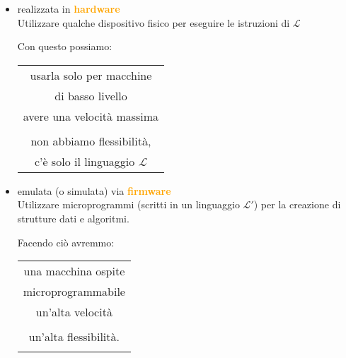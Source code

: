 \documentclass[a4paper,11pt,hidelinks]{book}
\theoremstyle{definition}
\begin{document}
    \begin{multicols}{2}
    
    \begin{itemize}
        \item realizzata in \textcolor{orange}{\textbf{hardware}} \label{realizzare HW} \\
        Utilizzare qualche dispositivo fisico per eseguire le istruzioni di $\mathcal{L}$ 
        
        \vspace{0.41cm}

        Con questo possiamo:

        \begin{tabular}{|c|}
        \hline
            usarla solo per macchine \\ di basso livello   \\ \hline
            avere una velocità massima \\ \\ \hline
            non abbiamo flessibilità, \\ c'è solo il linguaggio $\mathcal{L}$ \\ \hline
        \end{tabular}
        
        
        
        \item emulata (o simulata) via \textcolor{orange}{\textbf{firmware}} \label{emulare via FW} \\
        Utilizzare microprogrammi (scritti in un linguaggio $\mathcal{L}'$) per la creazione di strutture dati e algoritmi. 
        

        Facendo ciò avremmo:
        
        \begin{tabular}{|c|}
        \hline
            una macchina ospite \\ microprogrammabile \\ \hline
            un'alta velocità \\ \\ \hline
            un'alta flessibilità. \\ \\ \hline
        \end{tabular}
    \end{itemize}
    
    \end{multicols}
    
    \newpage
    
\end{document}

